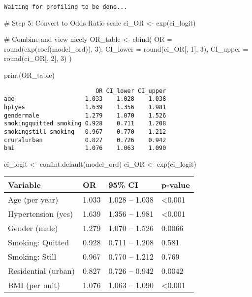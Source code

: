 \documentclass[
  letterpaper,
  DIV=11,
  numbers=noendperiod]{scrartcl}
\newenvironment{Shaded}{\begin{snugshade}}{\end{snugshade}}
\newcommand{\AttributeTok}[1]{\textcolor[rgb]{0.40,0.45,0.13}{#1}}
\newcommand{\CommentTok}[1]{\textcolor[rgb]{0.37,0.37,0.37}{#1}}
\newcommand{\DecValTok}[1]{\textcolor[rgb]{0.68,0.00,0.00}{#1}}
\newcommand{\FunctionTok}[1]{\textcolor[rgb]{0.28,0.35,0.67}{#1}}
\newcommand{\NormalTok}[1]{\textcolor[rgb]{0.00,0.23,0.31}{#1}}
\newcommand{\OtherTok}[1]{\textcolor[rgb]{0.00,0.23,0.31}{#1}}
\begin{document}
\begin{verbatim}
Waiting for profiling to be done...
\end{verbatim}

\begin{Shaded}
\begin{Highlighting}[]
\CommentTok{\# Step 5: Convert to Odds Ratio scale}
\NormalTok{ci\_OR }\OtherTok{\textless{}{-}} \FunctionTok{exp}\NormalTok{(ci\_logit)}

\CommentTok{\# Combine and view nicely}
\NormalTok{OR\_table }\OtherTok{\textless{}{-}} \FunctionTok{cbind}\NormalTok{(}
  \AttributeTok{OR =} \FunctionTok{round}\NormalTok{(}\FunctionTok{exp}\NormalTok{(}\FunctionTok{coef}\NormalTok{(model\_ord)), }\DecValTok{3}\NormalTok{),}
  \AttributeTok{CI\_lower =} \FunctionTok{round}\NormalTok{(ci\_OR[, }\DecValTok{1}\NormalTok{], }\DecValTok{3}\NormalTok{),}
  \AttributeTok{CI\_upper =} \FunctionTok{round}\NormalTok{(ci\_OR[, }\DecValTok{2}\NormalTok{], }\DecValTok{3}\NormalTok{)}
\NormalTok{)}

\FunctionTok{print}\NormalTok{(OR\_table)}
\end{Highlighting}
\end{Shaded}

\begin{verbatim}
                          OR CI_lower CI_upper
age                    1.033    1.028    1.038
hptyes                 1.639    1.356    1.981
gendermale             1.279    1.070    1.526
smokingquitted smoking 0.928    0.711    1.208
smokingstill smoking   0.967    0.770    1.212
cruralurban            0.827    0.726    0.942
bmi                    1.076    1.063    1.090
\end{verbatim}

\begin{Shaded}
\begin{Highlighting}[]
\NormalTok{ci\_logit }\OtherTok{\textless{}{-}} \FunctionTok{confint.default}\NormalTok{(model\_ord)}
\NormalTok{ci\_OR }\OtherTok{\textless{}{-}} \FunctionTok{exp}\NormalTok{(ci\_logit)}
\end{Highlighting}
\end{Shaded}

\begin{longtable}[]{@{}llll@{}}
\toprule\noalign{}
Variable & OR & 95\% CI & p-value \\
\midrule\noalign{}
\endhead
\bottomrule\noalign{}
\endlastfoot
Age (per year) & 1.033 & 1.028 -- 1.038 & \textless0.001 \\
Hypertension (yes) & 1.639 & 1.356 -- 1.981 & \textless0.001 \\
Gender (male) & 1.279 & 1.070 -- 1.526 & 0.0066 \\
Smoking: Quitted & 0.928 & 0.711 -- 1.208 & 0.581 \\
Smoking: Still & 0.967 & 0.770 -- 1.212 & 0.769 \\
Residential (urban) & 0.827 & 0.726 -- 0.942 & 0.0042 \\
BMI (per unit) & 1.076 & 1.063 -- 1.090 & \textless0.001 \\
\end{longtable}
\end{document}
